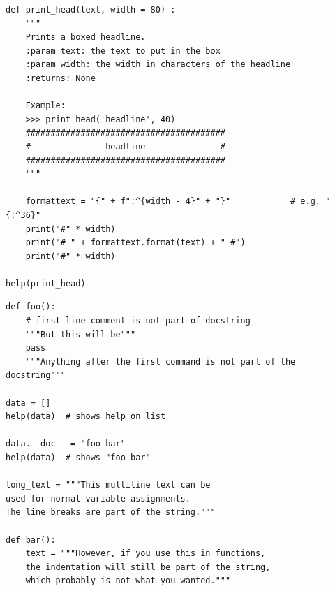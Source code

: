 \begin{frame}[fragile]
%
\vspace{-3pt}
\begin{codebox}
\begin{verbatim}
def print_head(text, width = 80) :
    """
    Prints a boxed headline.
    :param text: the text to put in the box
    :param width: the width in characters of the headline
    :returns: None
    
    Example:
    >>> print_head('headline', 40)
    ########################################
    #               headline               #
    ########################################
    """
    
    formattext = "{" + f":^{width - 4}" + "}"            # e.g. "{:^36}"
    print("#" * width)
    print("# " + formattext.format(text) + " #")
    print("#" * width)

help(print_head)
\end{verbatim}
\end{codebox}
%
\end{frame}


\begin{frame}[fragile]
%
\vspace{-3pt}
\begin{codebox}
\begin{verbatim}
def foo():
    # first line comment is not part of docstring
    """But this will be"""    
    pass
    """Anything after the first command is not part of the docstring"""

data = []
help(data)  # shows help on list

data.__doc__ = "foo bar"
help(data)  # shows "foo bar"

long_text = """This multiline text can be
used for normal variable assignments.
The line breaks are part of the string."""

def bar():
    text = """However, if you use this in functions,
    the indentation will still be part of the string,
    which probably is not what you wanted."""
\end{verbatim}
\end{codebox}
%
\end{frame}


